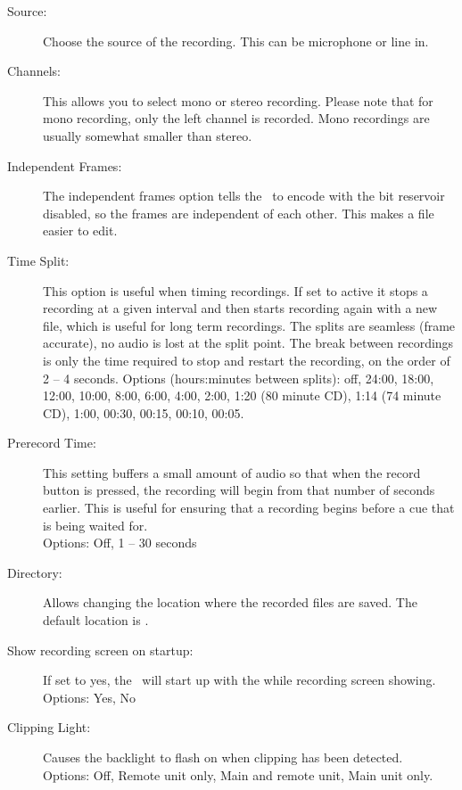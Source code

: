 {\begin{description}
  \item[Source:]
    Choose the source of the recording. This can be 
     microphone or line in.
    
        {}
    
  \item[Channels:]
    This allows you to select mono or stereo recording. Please note that 
    for mono recording, only the left channel is recorded.  Mono recordings
    are usually somewhat smaller than stereo.
    
  \item[Independent Frames:]
    The independent frames option tells the \dap\ to encode with the bit
    reservoir disabled, so the frames are independent of each other. This
    makes a file easier to edit.
    
  \item[Time Split:]
    This option is useful when timing recordings. If set to active it stops 
    a recording at a given interval and then starts recording again with a 
    new file, which is useful for long term recordings.
    \newline
    The splits are seamless (frame accurate), no audio is lost at the split 
    point. The break between recordings is only the time required to stop
    and restart the recording, on the order of 2 -- 4 seconds.
    \newline
    Options (hours:minutes between splits): off, 24:00, 18:00, 12:00, 10:00, 
    8:00, 6:00, 4:00, 2:00, 1:20 (80 minute CD), 1:14 (74 minute  CD), 1:00, 
    00:30, 00:15, 00:10, 00:05.
    
  \item[Prerecord Time:]
    This setting buffers a small amount of audio so that when the record button 
    is pressed, the recording will begin from that number of seconds earlier.
    This is useful for ensuring that a recording begins before a cue that is
    being waited for.\\
    Options: Off, 1 -- 30 seconds
    
  \item[Directory:]
    Allows changing the location where the recorded files are saved. The
    default location is .
    
  \item[Show recording screen on startup:]
    If set to yes, the \dap\ will start up with the while recording screen 
    showing.\\
    Options: Yes, No\\
    
  \item[Clipping Light:]
    Causes the backlight to flash on when clipping has been detected.\\
    Options: Off, Remote unit only, Main and remote unit, Main unit only.
    
  \end{description}
}
 
